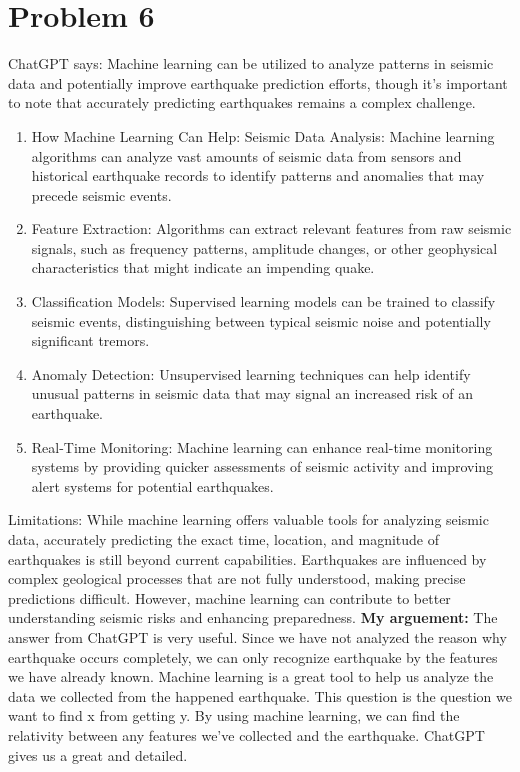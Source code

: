 \documentclass[12pt,a4paper]{article}
\begin{document}
\newpage
\section*{Problem 6}
ChatGPT says:
\newline
Machine learning can be utilized to analyze patterns in seismic data and potentially improve earthquake prediction efforts, though it's important to note that accurately predicting earthquakes remains a complex challenge.
\newline
\begin{enumerate}
    \item How Machine Learning Can Help: Seismic Data Analysis: Machine learning algorithms can analyze vast amounts of seismic data from sensors and historical earthquake records to identify patterns and anomalies that may precede seismic events.
    \item Feature Extraction: Algorithms can extract relevant features from raw seismic signals, such as frequency patterns, amplitude changes, or other geophysical characteristics that might indicate an impending quake.
    \item Classification Models: Supervised learning models can be trained to classify seismic events, distinguishing between typical seismic noise and potentially significant tremors.
    \item Anomaly Detection: Unsupervised learning techniques can help identify unusual patterns in seismic data that may signal an increased risk of an earthquake.
    \item Real-Time Monitoring: Machine learning can enhance real-time monitoring systems by providing quicker assessments of seismic activity and improving alert systems for potential earthquakes.    
\end{enumerate}
Limitations:
While machine learning offers valuable tools for analyzing seismic data, accurately predicting the exact time, location, and magnitude of earthquakes is still beyond current capabilities.
Earthquakes are influenced by complex geological processes that are not fully understood, making precise predictions difficult.
However, machine learning can contribute to better understanding seismic risks and enhancing preparedness.
\newline
\hspace*{\fill}
\newline
\textbf{My arguement:}
\newline
The answer from ChatGPT is very useful. Since we have not analyzed the reason why earthquake occurs completely,
we can only recognize earthquake by the features we have already known. Machine learning is a great tool to help us
analyze the data we collected from the happened earthquake. This question is the question we want to find x from getting y.
By using machine learning, we can find the relativity between any features we've collected and the earthquake.
ChatGPT gives us a great and detailed.
\end{document}
